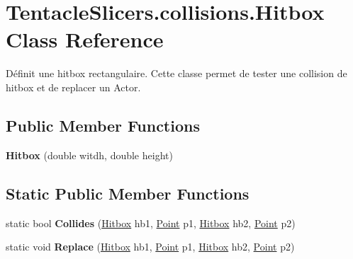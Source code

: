 \hypertarget{class_tentacle_slicers_1_1collisions_1_1_hitbox}{}\section{Tentacle\+Slicers.\+collisions.\+Hitbox Class Reference}
\label{class_tentacle_slicers_1_1collisions_1_1_hitbox}


Définit une hitbox rectangulaire. Cette classe permet de tester une collision de hitbox et de replacer un Actor.  


\subsection*{Public Member Functions}
\begin{DoxyCompactItemize}
\item 
\mbox{\label{class_tentacle_slicers_1_1collisions_1_1_hitbox_adda29a53e97876c19dd8d19424f44cf1}} 
{\bfseries Hitbox} (double witdh, double height)
\end{DoxyCompactItemize}
\subsection*{Static Public Member Functions}
\begin{DoxyCompactItemize}
\item 
\mbox{\label{class_tentacle_slicers_1_1collisions_1_1_hitbox_a82b6c4c455842160c859b9d35ca5600a}} 
static bool {\bfseries Collides} (\hyperlink{class_tentacle_slicers_1_1collisions_1_1_hitbox}{Hitbox} hb1, \hyperlink{class_tentacle_slicers_1_1general_1_1_point}{Point} p1, \hyperlink{class_tentacle_slicers_1_1collisions_1_1_hitbox}{Hitbox} hb2, \hyperlink{class_tentacle_slicers_1_1general_1_1_point}{Point} p2)
\item 
\mbox{\label{class_tentacle_slicers_1_1collisions_1_1_hitbox_a97618573f6ebc739bb7fe02936db5915}} 
static void {\bfseries Replace} (\hyperlink{class_tentacle_slicers_1_1collisions_1_1_hitbox}{Hitbox} hb1, \hyperlink{class_tentacle_slicers_1_1general_1_1_point}{Point} p1, \hyperlink{class_tentacle_slicers_1_1collisions_1_1_hitbox}{Hitbox} hb2, \hyperlink{class_tentacle_slicers_1_1general_1_1_point}{Point} p2)
\end{DoxyCompactItemize}


